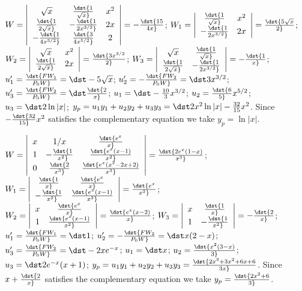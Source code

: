 \documentclass[dvips]{book}
\renewcommand{\exer}[1]{\par\medskip\;\noindent{\color{red}\bf #1.}}
\numberwithin{example}{section}
\numberwithin{equation}{section}
\numberwithin{theorem}{section}
\numberwithin{table}{section}
\numberwithin{figure}{section}
\begin{document}
\exer{9.4.8}
$W=\left|\begin{array}{cccc}
\sqrt{x}&\dst{1\over \sqrt{x}}&x^2\\
\dst{1\over 2\sqrt{x}}&-\dst{1\over 2x^{3/2}}&2x\\
-\dst{1\over 4x^{3/2}}&\dst{3\over 4x^{5/2}}&2
\end{array}\right|=-\dst{15\over 4x}$;
$W_1=\left|\begin{array}{cccc}
\dst{1\over \sqrt{x}}&x^2\\
-\dst{1\over 2x^{3/2}}&2x
\end{array}\right|=\dst{5\sqrt{x}\over 2}$;
$W_2=\left|\begin{array}{cccc}
\sqrt{x}&x^2\\
\dst{1\over 2\sqrt{x}}&2x
\end{array}\right|=\dst{3x^{3/2}\over 2}$;
$W_3=\left|\begin{array}{cccc}
\sqrt{x}&\dst{1\over \sqrt{x}}\\
\dst{1\over 2\sqrt{x}}&-\dst{1\over 2x^{3/2}}
\end{array}\right|=-\dst{1\over x}$;
$u_1'=\dst{FW_1\over P_0W}=\dst-5\sqrt{x}$;
$u_2'=-\dst{FW_2\over P_0W}=\dst3x^{3/2}$;
$u_3'=\dst{FW_2\over P_0W}=\dst\dst{2\over x}$;
$u_1=\dst-{10\over3}x^{3/2}$;
$u_2=\dst{6\over5}x^{5/2}$;
$u_3=\dst2\ln|x|$;
$y_p=u_1y_1+u_2y_2+u_3y_3=\dst2x^2\ln|x|-{32\over15}x^2$.
Since $-\dst{32\over15}x^2$ satisfies the complementary equation
we take $y_p=\ln|x|$.




\exer{9.4.10}
$W=\left|\begin{array}{cccc}
x&1/x&\dst{e^x\over x}\\1&-\dst{1\over x^2}&\dst{e^x(x-1)\over x^2}\\
0&\dst{2\over x^3}&\dst{e^x(x^2-2x+2)\over x^3}
\end{array}\right|=\dst{2e^x(1-x)\over x^3}$;
$W_1=\left|\begin{array}{cccc}
\dst{1\over x}&\dst{e^x\over x}\\-\dst{1\over
x^2}&\dst{e^x(x-1)\over x^2}
\end{array}\right|=\dst{e^x\over x^2}$;
$W_2=\left|\begin{array}{cccc}
x&\dst{e^x\over x}\\
1&\dst{e^x(x-1)\over x^2}
\end{array}\right|=\dst{e^x(x-2)\over x}$;
$W_3=\left|\begin{array}{cccc}
x&\dst{1\over x}\\
1&-\dst{1\over x^2}
\end{array}\right|=-\dst{2\over x}$;
$u_1'=\dst{FW_1\over P_0W}=\dst1$;
$u_2'=-\dst{FW_2\over P_0W}=\dst x(2-x)$;
$u_3'=\dst{FW_2\over P_0W}=\dst-2xe^{-x}$;
$u_1=\dst x$;
$u_2=\dst {x^2(3-x)\over 3}$;
$u_3=\dst2e^{-x}(x+1)$;
$y_p=u_1y_1+u_2y_2+u_3y_3=\dst{2x^3+3x^2+6x+6\over 3x}$.
Since $x+\dst{2\over x}$ satisfies the complementary equation
we take $y_p=\dst{2x^2+6\over3}$.
\end{document}
